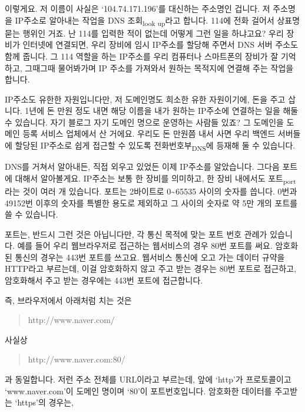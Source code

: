 \documentclass[11pt,a4paper]{article}
\newcommand{\sub}[1]{\textsubscript{#1}}
\begin{document}
이렇게요. 저 이름이 사실은 `104.74.171.196'를 대신하는 주소명인 겁니다. 저 주소명을 IP주소로 알아내는 작업을 DNS 조회\sub{look up}라고 합니다. 114에 전화 걸어서 상표명 묻는 행위인 거죠. 난 114를 입력한 적이 없는데 어떻게 그런 일을 하냐고요? 우리 장비가 인터넷에 연결되면, 우리 장비에 임시 IP주소를 할당해 주면서 DNS 서버 주소도 함께 줍니다. 그 114 역할을 하는 IP주소를 우리 컴퓨터나 스마트폰의 장비가 잘 기억하고, 그때그때 물어봐가며 IP 주소를 가져와서 원하는 목적지에 연결해 주는 작업을 합니다.

IP주소도 유한한 자원입니다만, 저 도메인명도 희소한 유한 자원이기에, 돈을 주고 삽니다. 1년에 돈 만원 정도 내면 해당 이름을 내가 원하는 IP주소에 연결하는 일을 해둘 수 있습니다. 자기 블로그 자기 도메인 명으로 운영하는 사람들 있죠? 그 도메인을 도메인 등록 서비스 업체에서 산 거에요. 우리도 돈 만원쯤 내서 사면 우리 백엔드 서버들에 할당된 IP주소로 쉽게 접근할 수 있도록 전화번호부\sub{DNS}에 등재해 둘 수 있습니다.

DNS를 거쳐서 알아내든, 직접 외우고 있었든 이제 IP주소를 알았습니다. 그다음 포트에 대해서 알아볼게요. IP주소는 보통 한 장비를 의미하고, 한 장비 내에서도 포트\sub{port}라는 것이 여러 개 있습니다. 포트는 2바이트로 0\textasciitilde65535 사이의 숫자를 씁니다.  0번과 49152번 이후의 숫자를 특별한 용도로 제외하고 그 사이의 숫자로 약 5만 개의 포트를 쓸 수 있습니다.

포트는, 반드시 그런 것은 아닙니다만, 각 통신 목적에 맞는 포트 번호 관례가 있습니다. 예를 들어 우리 웹브라우저로 접근하는 웹서비스의 경우 80번 포트를 써요. 암호화된 통신의 경우는 443번 포트를 쓰고요. 웹서비스 통신에 오고 가는 데이터 규약을 HTTP라고 부르는데, 이걸 암호화하지 않고 주고 받는 경우는 80번 포트로 접근하고, 암호화해서 주고 받는 경우에는 443번 포트에 접근합니다.

즉, 브라우저에서 아래처럼 치는 것은

\begin{quote}
http://www.naver.com/
\end{quote}

사실상

\begin{quote}
http://www.naver.com:80/
\end{quote}

과 동일합니다. 저런 주소 전체를 URL이라고 부르는데, 앞에 `http'가 프로토콜이고 `www.naver.com'이 도메인 명이며 `80'이 포트번호입니다. 암호화한 데이터를 주고받는 `https'의 경우는,

\begin{quote}
\end{quote}
\end{document}
